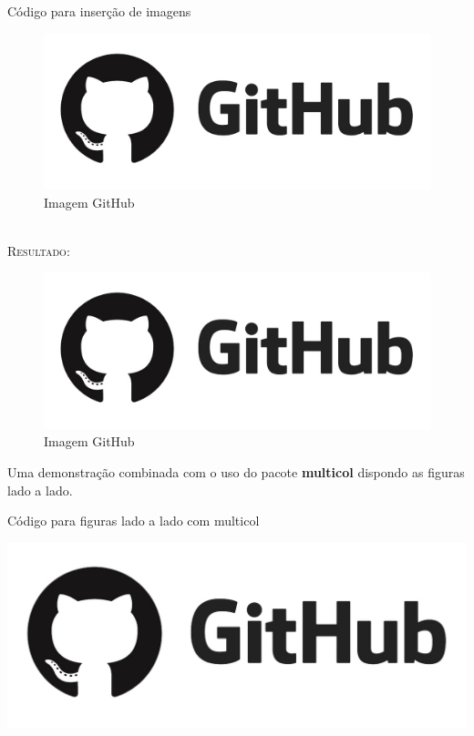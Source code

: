 \documentclass[a4paper,12pt,oneside,openright,extrafontsizes,openbib]{memoir}
\begin{document}
{\begin{codex}{Código para inserção de imagens}
\begin{figure}[h!]
\begin{center}
\includegraphics[scale=.30]{./img/github.png}
\caption{Imagem GitHub}
\label{fig:github}
\end{center}
\end{figure}
\end{codex}
\ \\

\textsc{Resultado:}

\begin{figure}[h!]
	\begin{center}
		\includegraphics[scale=.30]{./img/github.png}
		\caption{Imagem GitHub}
		\label{fig:github}
	\end{center}
\end{figure}

Uma demonstração combinada com o uso do pacote \textbf{multicol} dispondo as figuras lado a lado.
\ \\

\begin{codex}{Código para figuras lado a lado com multicol}
\begin{multicols}{2}
\includegraphics[scale=.15]{./img/github.png}


\end{multicols}
\end{codex}}
\end{document}
